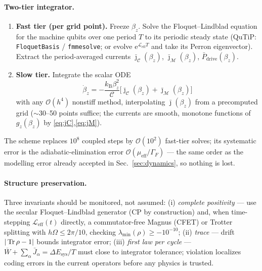 \documentclass[11pt,a4paper]{article}
\theoremstyle{definition}
\theoremstyle{remark}
\newcommand{\ee}{\mathrm{e}}
\newcommand{\kB}{k_{\mathrm{B}}}
\begin{document}
\paragraph{Two-tier integrator.}
\begin{enumerate}[leftmargin=*]
\item \textbf{Fast tier (per grid point).} Freeze $\beta_z$. Solve the
Floquet--Lindblad equation for the machine qubits over one period $T$
to its periodic steady state (QuTiP: \texttt{FloquetBasis} /
\texttt{fmmesolve}; or evolve $\ee^{\mathcal{L}_{\mathrm{eff}}T}$ and
take its Perron eigenvector). Extract the period-averaged currents
$\bar\jmath_\mathcal{C}(\beta_z)$, $\bar\jmath_\mathcal{M}(\beta_z)$,
$\bar P_{\mathrm{drive}}(\beta_z)$.
\item \textbf{Slow tier.} Integrate the scalar ODE
\begin{equation}
\dot\beta_z = -\frac{\kB\beta_z^{2}}{\mathcal{C}}
\big[\bar\jmath_\mathcal{C}(\beta_z)+\bar\jmath_\mathcal{M}(\beta_z)\big]
\label{eq:slowODE}
\end{equation}
with any $\mathcal{O}(h^4)$ nonstiff method, interpolating
$\bar\jmath(\beta_z)$ from a precomputed grid ($\sim$30--50 points
suffice; the currents are smooth, monotone functions of
$g_z(\beta_z)$ by \eqref{eq:jC},\eqref{eq:jM}).
\end{enumerate}
The scheme replaces $10^{8}$ coupled steps by
$\mathcal{O}(10^{2})$ fast-tier solves; its systematic error is the
adiabatic-elimination error $\mathcal{O}(\mu_{\mathrm{eff}}/\Gamma_F)$
--- the same order as the modelling error already accepted in
Sec.~\ref{sec:dynamics}, so nothing is lost.
 
\paragraph{Structure preservation.} Three invariants should be
monitored, not assumed:
(i) \emph{complete positivity} --- use the secular Floquet--Lindblad
generator (CP by construction) and, when time-stepping
$\mathcal{L}_{\mathrm{eff}}(t)$ directly, a commutator-free Magnus
(CFET) or Trotter splitting with $h\Omega \le 2\pi/10$, checking
$\lambda_{\min}(\rho) \ge -10^{-10}$;
(ii) \emph{trace} --- drift $|\Tr\rho-1|$ bounds integrator error;
(iii) \emph{first law per cycle} ---
$\overline{W} + \sum_\alpha \bar J_\alpha = \Delta E_{\mathrm{sys}}/T$
must close to integrator tolerance; violation localizes coding errors
in the current operators before any physics is trusted.
 
\end{document}
